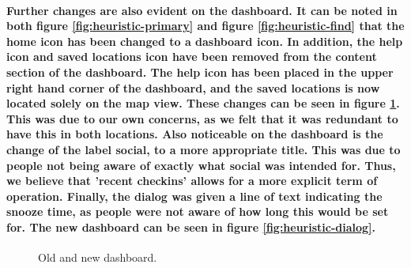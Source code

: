 \documentclass{report}
\begin{document}
    \paragraph{Further changes are also evident on the dashboard. It can be
    noted in both figure \ref{fig:heuristic-primary} and figure 
    \ref{fig:heuristic-find} that the home icon has been changed
    to a dashboard icon. In addition, the help icon and saved locations icon have
    been removed from the content section of the dashboard. The help icon has been
    placed in the upper right hand corner of the dashboard, and the saved locations
    is now located solely on the map view. These changes can be seen in figure
    \ref{fig:heuristic-dashboard}. This was due to our own concerns, as we felt that it was redundant to
    have this in both locations. Also noticeable on the dashboard is the change of
    the label social, to a more appropriate title. This was due to people not being
    aware of exactly what social was intended for. Thus, we believe that 'recent
    checkins' allows for a more explicit term of operation. Finally, the dialog was
    given a line of text indicating the snooze time, as people were not aware of how
    long this would be set for. The new dashboard can be seen in figure
    \ref{fig:heuristic-dialog}.}
    \begin{figure}
    \centering
    \caption{Old and new dashboard.}
    \label{fig:heuristic-dashboard}
    \end{figure}
\end{document}
